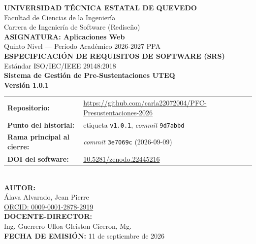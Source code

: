 \documentclass[11pt,a4paper]{article}
\title{}\date{}
\begin{document}
\begin{titlepage}
\centering
\vspace*{0.8cm}
{\LARGE \textbf{UNIVERSIDAD TÉCNICA ESTATAL DE QUEVEDO}}\\[0.3cm]
{\large Facultad de Ciencias de la Ingeniería}\\[0.2cm]
{\large Carrera de Ingeniería de Software (Rediseño)}\\[0.8cm]

{\large \textbf{ASIGNATURA: Aplicaciones Web}}\\[0.3cm]
{\large Quinto Nivel --- Período Académico 2026-2027 PPA}\\[1.0cm]

{\Large \textbf{ESPECIFICACIÓN DE REQUISITOS DE SOFTWARE (SRS)}}\\[0.3cm]
{\large Estándar ISO/IEC/IEEE 29148:2018}\\[0.6cm]
{\LARGE \textbf{Sistema de Gestión de Pre-Sustentaciones UTEQ}}\\[0.6cm]
{\Large \textbf{Versión 1.0.1}}\\[0.9cm]

\small\begin{tabular}{ll}
\textbf{Repositorio:} & \url{https://github.com/carla22072004/PFC-Presustentaciones-2026} \\
\textbf{Punto del historial:} & etiqueta \texttt{v1.0.1}, \emph{commit} \texttt{9d7abbd} \\
\textbf{Rama principal al cierre:} & \emph{commit} \texttt{3e7069c} (2026-09-09) \\
\textbf{DOI del software:} & \href{https://doi.org/10.5281/zenodo.22445216}{10.5281/zenodo.22445216} \\
\end{tabular}\normalsize\\[1.0cm]

{\large \textbf{AUTOR:}}\\[0.3cm]
{\large Álava Alvarado, Jean Pierre}\\[0.1cm]
{\large \href{https://orcid.org/0009-0001-2878-2919}{ORCID: 0009-0001-2878-2919}}\\[0.8cm]

{\large \textbf{DOCENTE-DIRECTOR:}}\\[0.3cm]
{\large Ing. Guerrero Ulloa Gleiston Cíceron, Mg.}\\[0.8cm]

{\large \textbf{FECHA DE EMISIÓN:} 11 de septiembre de 2026}\\[0.3cm]
\end{titlepage}
\end{document}
